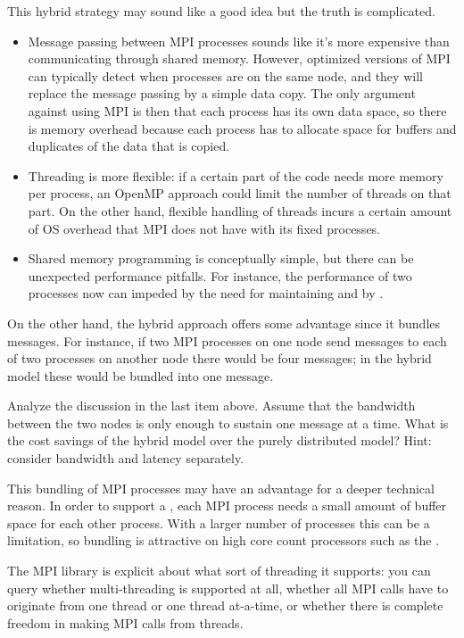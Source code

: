 This hybrid strategy may sound like a good idea but the truth is complicated.
\begin{itemize}
\item Message passing between MPI processes sounds like it's more
  expensive than communicating through shared memory. However,
  optimized versions of MPI can typically detect when processes are on
  the same node, and they will replace the message passing by a simple
  data copy. The only argument against using MPI is then that each
  process has its own data space, so there is memory overhead because
  each process has to allocate space for buffers and duplicates of the
  data that is copied.
\item Threading is more flexible: if a certain part of the code needs
  more memory per process, an OpenMP approach could limit the number
  of threads on that part. On the other hand, flexible handling of
  threads incurs a certain amount of \ac{OS} overhead that MPI does
  not have with its fixed processes.
\item Shared memory programming is conceptually simple, but there can
  be unexpected performance pitfalls. For instance, the performance of
  two processes now
  can impeded by the need for maintaining
   and by .
\end{itemize}

On the other hand, the hybrid approach offers some advantage since it
bundles messages. For instance, if two MPI processes on one node send
messages to each of two processes on another node there would be four
messages; in the hybrid model these would be bundled into one
message.

\begin{exercise}
  Analyze the discussion in the last item above. Assume that the
  bandwidth between the two nodes is only enough to sustain one
  message at a time. What is the cost savings of the hybrid model over
  the purely distributed model? Hint: consider bandwidth and latency
  separately.
\end{exercise}

This bundling of MPI processes may have an advantage for a deeper
technical reason. In order to support a ,
each MPI process needs a small amount of buffer space for each other process.
With a larger number of processes this can be a limitation, so bundling
is attractive on high core count processors such as the .

The MPI library is explicit about what sort of threading it supports:
you can query whether multi-threading is supported at all, whether all MPI 
calls have to originate from one thread or one thread at-a-time, or whether 
there is complete freedom in making MPI calls from threads.
